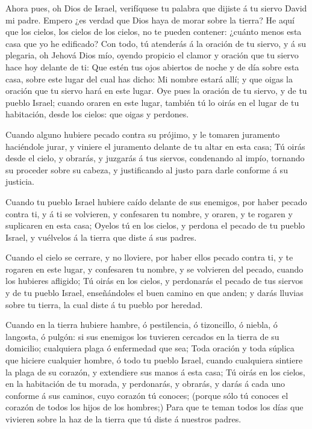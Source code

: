  Ahora pues, oh Dios de Israel, verifíquese tu palabra
que dijiste á tu siervo David mi padre.  Empero ¿es
verdad que Dios haya de morar sobre la tierra? He aquí que los cielos,
los cielos de los cielos, no te pueden contener: ¿cuánto menos esta casa
que yo he edificado?  Con todo, tú atenderás á la oración
de tu siervo, y á su plegaria, oh Jehová Dios mío, oyendo propicio el
clamor y oración que tu siervo hace hoy delante de ti: 
Que estén tus ojos abiertos de noche y de día sobre esta casa, sobre
este lugar del cual has dicho: Mi nombre estará allí; y que oigas la
oración que tu siervo hará en este lugar.  Oye pues la
oración de tu siervo, y de tu pueblo Israel; cuando oraren en este
lugar, también tú lo oirás en el lugar de tu habitación, desde los
cielos: que oigas y perdones.

 Cuando alguno hubiere pecado contra su prójimo, y le
tomaren juramento haciéndole jurar, y viniere el juramento delante de tu
altar en esta casa;  Tú oirás desde el cielo, y obrarás,
y juzgarás á tus siervos, condenando al impío, tornando su proceder
sobre su cabeza, y justificando al justo para darle conforme á su
justicia.

 Cuando tu pueblo Israel hubiere caído delante de sus
enemigos, por haber pecado contra ti, y á ti se volvieren, y confesaren
tu nombre, y oraren, y te rogaren y suplicaren en esta casa;
 Oyelos tú en los cielos, y perdona el pecado de tu
pueblo Israel, y vuélvelos á la tierra que diste á sus padres.

 Cuando el cielo se cerrare, y no lloviere, por haber
ellos pecado contra ti, y te rogaren en este lugar, y confesaren tu
nombre, y se volvieren del pecado, cuando los hubieres afligido;
 Tú oirás en los cielos, y perdonarás el pecado de tus
siervos y de tu pueblo Israel, enseñándoles el buen camino en que anden;
y darás lluvias sobre tu tierra, la cual diste á tu pueblo por heredad.

 Cuando en la tierra hubiere hambre, ó pestilencia, ó
tizoncillo, ó niebla, ó langosta, ó pulgón: si sus enemigos los tuvieren
cercados en la tierra de su domicilio; cualquiera plaga ó enfermedad que
sea;  Toda oración y toda súplica que hiciere cualquier
hombre, ó todo tu pueblo Israel, cuando cualquiera sintiere la plaga de
su corazón, y extendiere sus manos á esta casa;  Tú oirás
en los cielos, en la habitación de tu morada, y perdonarás, y obrarás, y
darás á cada uno conforme á sus caminos, cuyo corazón tú conoces;
(porque sólo tú conoces el corazón de todos los hijos de los hombres;)
 Para que te teman todos los días que vivieren sobre la
haz de la tierra que tú diste á nuestros padres.

